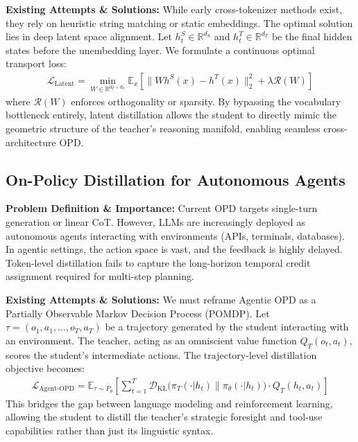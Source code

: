 \textbf{Existing Attempts \& Solutions:} While early cross-tokenizer methods exist, they rely on heuristic string matching or static embeddings. The optimal solution lies in deep latent space alignment. Let $h_t^S \in \mathbb{R}^{d_S}$ and $h_t^T \in \mathbb{R}^{d_T}$ be the final hidden states before the unembedding layer. We formulate a continuous optimal transport loss:
\begin{align}
\mathcal{L}_{\text{Latent}} = \min_{W \in \mathbb{R}^{d_T \times d_S}} \mathbb{E}_{x} \left[ \parallel W h^S(x) - h^T(x) \parallel_2^2 + \lambda \mathcal{R}(W) \right]
\end{align}
where $\mathcal{R}(W)$ enforces orthogonality or sparsity. By bypassing the vocabulary bottleneck entirely, latent distillation allows the student to directly mimic the geometric structure of the teacher's reasoning manifold, enabling seamless cross-architecture OPD.

\subsection{On-Policy Distillation for Autonomous Agents}
\textbf{Problem Definition \& Importance:} Current OPD targets single-turn generation or linear CoT. However, LLMs are increasingly deployed as autonomous agents interacting with environments (APIs, terminals, databases). In agentic settings, the action space is vast, and the feedback is highly delayed. Token-level distillation fails to capture the long-horizon temporal credit assignment required for multi-step planning.

\textbf{Existing Attempts \& Solutions:} We must reframe Agentic OPD as a Partially Observable Markov Decision Process (POMDP). Let $\tau = (o_1, a_1, \dots, o_T, a_T)$ be a trajectory generated by the student interacting with an environment. The teacher, acting as an omniscient value function $Q_T(o_t, a_t)$, scores the student's intermediate actions. The trajectory-level distillation objective becomes:
\begin{align}
\mathcal{L}_{\text{Agent-OPD}} = \mathbb{E}_{\tau \sim P_\theta} \left[ \sum_{t=1}^T \mathcal{D}_{\text{KL}}\Big( \pi_T(\cdot | h_t) \parallel \pi_\theta(\cdot | h_t) \Big) \cdot Q_T(h_t, a_t) \right]
\end{align}
This bridges the gap between language modeling and reinforcement learning, allowing the student to distill the teacher's strategic foresight and tool-use capabilities rather than just its linguistic syntax.

